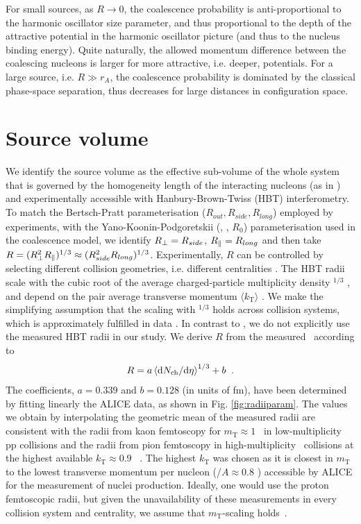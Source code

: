\documentclass[%
 reprint,
 amsmath,amssymb,
 aps,
]{revtex4-1}
\begin{document}
For small sources, as $R \rightarrow 0$, the coalescence probability is anti-proportional to the harmonic oscillator size parameter, and thus proportional to the depth of the attractive potential in the harmonic oscillator picture (and thus to the nucleus binding energy).
Quite naturally, the allowed momentum difference between the coalescing nucleons is larger for more attractive, i.e. deeper, potentials. 
For a large source, i.e. $R \gg r_A$, the coalescence probability is dominated by the classical phase-space separation, thus decreases for large distances in configuration space. 
%

\section{Source volume} \label{SecSourceVolume}
We identify the source volume as the effective sub-volume of the whole system that is governed by the homogeneity length of the interacting nucleons (as in \cite{Scheibl:1998tk}) and experimentally accessible with Hanbury-Brown-Twiss (HBT) interferometry. 
To match the Bertsch-Pratt parameterisation ($R_{out}, R_{side}, R_{long}$) employed by experiments, with the Yano-Koonin-Podgoretskii (\rperp, \rpar, $R_{0}$) parameterisation used in the coalescence model,  we identify $R_{\perp} = R_{side}$, $R_{\|} = R_{long}$ and then take $R = (R_{\perp}^{2}R_{\|})^{1/3} \approx (R_{side}^{2}R_{long})^{1/3}$.
%
Experimentally, $R$ can be controlled by selecting different collision geometries, i.e. different centralities \cite{Abelev:2013qoq}. 
The HBT radii scale with the cubic root of the average charged-particle multiplicity density \avdNdeta$^{1/3}$ \cite{Adam:2015vna}, and depend on the pair average transverse momentum $\langle k_{\mathrm{T}}\rangle$ \cite{Aamodt:2011mr}. We make the simplifying assumption that the scaling with \avdNdeta$^{1/3}$ holds across collision systems, which is approximately fulfilled in data \cite{Adam:2015pya}. 
In contrast to \cite{Blum:2017qnn}, we do not explicitly use the measured HBT radii in our study. We derive $R$ from the measured \avdNdeta~according to
%
\begin{equation}
R = a \left<\mathrm{d}N_\mathrm{ch}/\mathrm{d}\eta\right>^{1/3} + b \;\;.
\label{eq:radiusParameterisation}
\end{equation}
%
The coefficients, $a = 0.339$ and $b = 0.128$ (in units of fm), have been determined by fitting linearly the ALICE data, as shown in Fig. \ref{fig:radiiparam}. 
The values we obtain by interpolating the geometric mean of the measured radii are consistent with the radii from kaon femtoscopy for $m_{\mathrm{T}} \approx 1$ \GeVc~in low-multiplicity pp collisions \cite{Abelev:2012sq} and the radii from pion femtoscopy in high-multiplicity \PbPb~collisions at the highest available $k_{\mathrm{T}} \approx 0.9$ \GeVc~\cite{Adam:2015vna}. 
The highest $k_{\mathrm{T}}$ was chosen as it is closest in $m_{\mathrm{T}}$ to the lowest transverse momentum per nucleon (\pt/$A \approx 0.8$ \GeVc) accessible by ALICE for the measurement of nuclei production. 
Ideally, one would use the proton femtoscopic radii, but given the unavailability of these measurements in every collision system and centrality, we assume that $m_{\mathrm{T}}$-scaling holds~\cite{Adam:2015vja}. 
\end{document}
